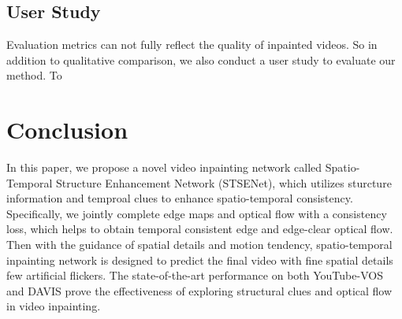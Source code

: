 \subsection{User Study}
Evaluation metrics can not fully reflect the quality of inpainted videos. So in addition to qualitative comparison, we also conduct a user study to evaluate our method. To


\section{Conclusion}
In this paper, we propose a novel video inpainting network called Spatio-Temporal Structure Enhancement Network (STSENet), which utilizes sturcture information and temproal clues to enhance spatio-temporal consistency. Specifically, we jointly complete edge maps and optical flow with a consistency loss, which helps to obtain temporal consistent edge and edge-clear optical flow. Then with the guidance of spatial details and motion tendency, spatio-temporal inpainting network is designed to predict the final video with fine spatial details few artificial flickers.
The state-of-the-art performance on both YouTube-VOS and DAVIS prove the effectiveness of exploring structural clues and optical flow in video inpainting.
 
